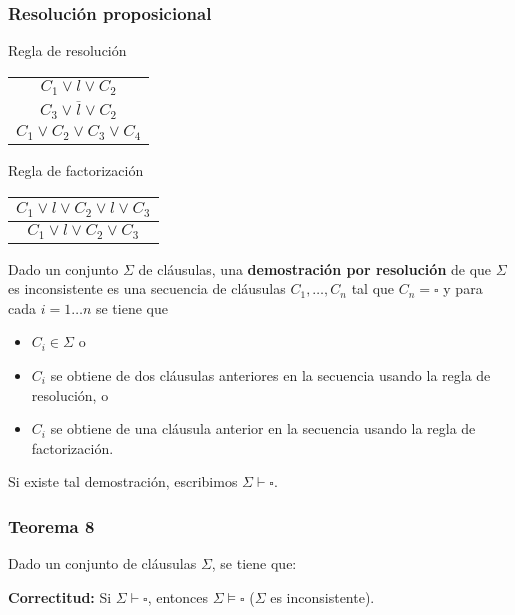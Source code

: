 \begin{multicols}{2}
    \subsubsection*{Resolución proposicional}
    \begin{multicols}{2}
    Regla de resolución \p
    
                  \begin{tabular}{c}
                      $C_1 \vee l \vee C_2$            \\
                      $C_3 \vee \overline{l} \vee C_2$ \\ \hline
                      $C_1 \vee C_2 \vee C_3 \vee C_4$
                  \end{tabular}
    
    Regla de factorización \p
    
                  \begin{tabular}{c}
                      $C_1 \vee l \vee C_2 \vee l \vee C_3$ \\ \hline
                      $C_1 \vee l \vee C_2 \vee C_3$
                  \end{tabular}
    \end{multicols}
    Dado un conjunto $\Sigma$ de cláusulas, una \textbf{demostración por resolución} de que $\Sigma$ es inconsistente es una secuencia de cláusulas $C_1,\ldots,C_n$ tal que $C_n = \square$ y para cada $i = 1\ldots n$ se tiene que
    
              \begin{itemize}
                  \item $C_i \in \Sigma$ o
                  \item $C_i$ se obtiene de dos cláusulas anteriores en la secuencia usando la regla de resolución, o
                  \item $C_i$ se obtiene de una cláusula anterior en la secuencia usando la regla de factorización.
              \end{itemize}
    
              Si existe tal demostración, escribimos $\Sigma \vdash \square$.
    
    \subsubsection*{Teorema 8}
    Dado un conjunto de cláusulas $\Sigma$, se tiene que: \p
        
    \textbf{Correctitud:} Si $\Sigma \vdash \square$, entonces $\Sigma \models \square$ ($\Sigma$ es inconsistente).
    

\end{multicols}
